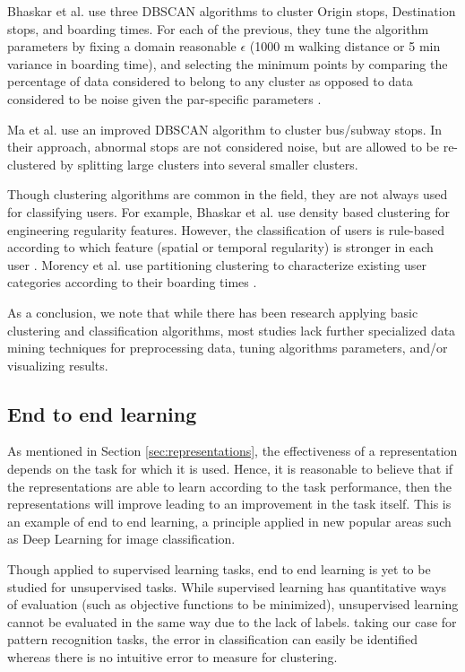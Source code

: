 \documentclass{article}
\begin{document}
Bhaskar et al. use three DBSCAN algorithms to cluster Origin stops, Destination stops, and boarding times. For each of the previous, they tune the algorithm parameters by fixing a domain reasonable $\epsilon$ (1000 m walking distance or 5 min variance in boarding time), and selecting the minimum points by comparing the percentage of data considered to belong to any cluster as opposed to data considered to be noise given the par-specific parameters \cite{bhaskar2015passenger}. 

Ma et al. use an improved DBSCAN algorithm to cluster bus/subway stops. In their approach, abnormal stops are not considered noise, but are allowed to be re-clustered by splitting large clusters into several smaller clusters. 

Though clustering algorithms are common in the field, they are not always used for classifying users. For example, Bhaskar et al. use density based clustering for engineering regularity features. However, the classification of users is rule-based according to which feature (spatial or temporal regularity) is stronger in each user \cite{bhaskar2015passenger}. Morency et al. use partitioning clustering to characterize existing user categories according to their boarding times \cite{morency2007measuring}. 

As a conclusion, we note that while there has been research applying basic clustering and classification algorithms, most studies lack further specialized data mining techniques for preprocessing data, tuning algorithms parameters, and/or visualizing results. 


\subsection{End to end learning}
As mentioned in Section \ref{sec:representations}, the effectiveness of a representation depends on the task for which it is used. 
Hence, it is reasonable to believe that if the representations are able to learn according to the task performance, then the representations will improve leading to an improvement in the task itself. This is an example of end to end learning, a principle applied in new popular areas such as Deep Learning for image classification.

Though applied to supervised learning tasks, end to end learning is yet to be studied for unsupervised tasks. While supervised learning has quantitative ways of evaluation (such as objective functions to be minimized), unsupervised learning cannot be evaluated in the same way due to the lack of labels. taking our case for pattern recognition tasks, the error in classification can easily be identified whereas there is no intuitive error to measure for clustering. 
\end{document}
